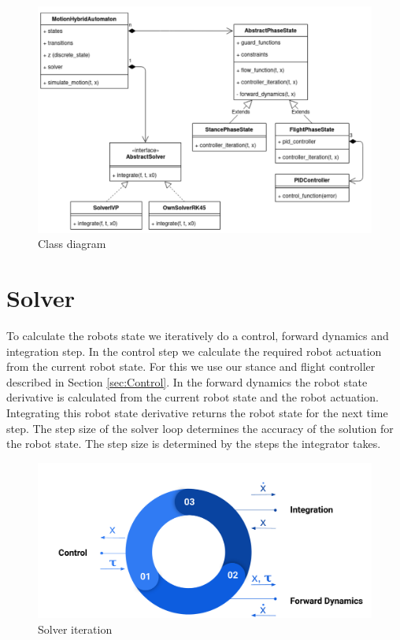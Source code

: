 \documentclass[journal,onecolumn]{IEEEtran}
\begin{document}
	\begin{figure}[h]
		\centering
		\includegraphics[scale=0.17]{"assets/class_structure.png"}
		\caption{Class diagram}
		\label{fig:class_diagram}
	\end{figure}
	
	\section{Solver}
	\label{sec:Solver}
	To calculate the robots state we iteratively do a control, forward dynamics and integration step. In the control step we calculate the required robot actuation from 
	the current robot state. For this we use our stance and flight controller described in Section \ref{sec:Control}. In the forward dynamics the robot state derivative 
	is calculated from the current robot state and the robot actuation. Integrating this robot state derivative returns the robot state for the next time step. The step size 
	of the solver loop determines the accuracy of the solution for the robot state. The step size is determined by the steps the integrator takes.
	
	
	\begin{figure}[h]
		\centering
		\includegraphics[scale=0.12]{"assets/solver_iteration.png"}
		\caption{Solver iteration}
		\label{fig:solver_iteration}
	\end{figure}
	
\end{document}
